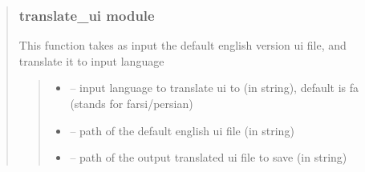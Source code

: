 \documentclass[letterpaper,10pt,english]{sphinxmanual}
\begin{document}
\begin{quote}
\begin{savenotes}
\begin{fulllineitems}
\end{fulllineitems}\end{savenotes}


\sphinxstepscope


\subsubsection{translate\_ui module}
\label{\detokenize{setting/translate_ui:module-oxin.translate_ui}}\label{\detokenize{setting/translate_ui:translate-ui-module}}\label{\detokenize{setting/translate_ui::doc}}

\begin{savenotes}\begin{fulllineitems}
\label{\detokenize{setting/translate_ui:oxin.translate_ui.translate_ui}}
\pysigstartsignatures
{}
\pysigstopsignatures
\sphinxAtStartPar
This function takes as input the default english version ui file, and translate it to input language
\begin{quote}\begin{description}
\begin{itemize}
\item {} 
\sphinxAtStartPar
{} – input language to translate ui to (in string), default is fa (stands for farsi/persian)

\item {} 
\sphinxAtStartPar
{} – path of the default english ui file (in string)

\item {} 
\sphinxAtStartPar
{} – path of the output translated ui file to save (in string)

\end{itemize}


\end{description}
\end{quote}
\end{fulllineitems}
\end{savenotes}
\end{quote}
\end{document}
